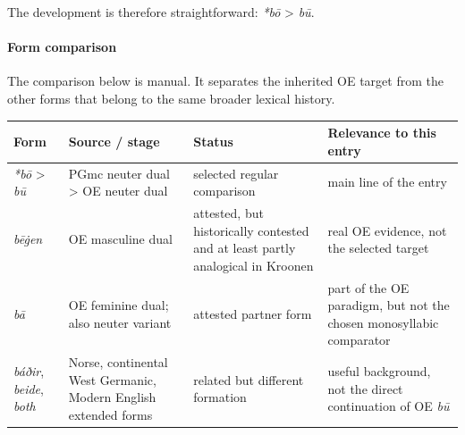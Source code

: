 \documentclass[
  british,
  a4paper,
]{article}
\newcounter{none} %
\begin{document}
The development is therefore straightforward: \emph{*bō} \textgreater{}
\emph{bū}.

\paragraph{Form comparison}\label{form-comparison}

The comparison below is manual. It separates the inherited OE target
from the other forms that belong to the same broader lexical history.

{\def\LTcaptype{none} %
\begin{longtable}[]{@{}
  >{\raggedright\arraybackslash}p{}
  >{\raggedright\arraybackslash}p{}
  >{\raggedright\arraybackslash}p{}
  >{\raggedright\arraybackslash}p{}@{}}
\toprule\noalign{}
\begin{minipage}[b]{\linewidth}\raggedright
Form
\end{minipage} & \begin{minipage}[b]{\linewidth}\raggedright
Source / stage
\end{minipage} & \begin{minipage}[b]{\linewidth}\raggedright
Status
\end{minipage} & \begin{minipage}[b]{\linewidth}\raggedright
Relevance to this entry
\end{minipage} \\
\midrule\noalign{}
\endhead
\bottomrule\noalign{}
\endlastfoot
\emph{*bō} \textgreater{} \emph{bū} & PGmc neuter dual \textgreater{} OE
neuter dual & selected regular comparison & main line of the entry \\
\emph{bēġen} & OE masculine dual & attested, but historically contested
and at least partly analogical in Kroonen & real OE evidence, not the
selected target \\
\emph{bā} & OE feminine dual; also neuter variant & attested partner
form & part of the OE paradigm, but not the chosen monosyllabic
comparator \\
\emph{báðir}, \emph{beide}, \emph{both} & Norse, continental West
Germanic, Modern English extended forms & related but different
formation & useful background, not the direct continuation of OE
\emph{bū} \\
\end{longtable}
}
\end{document}
